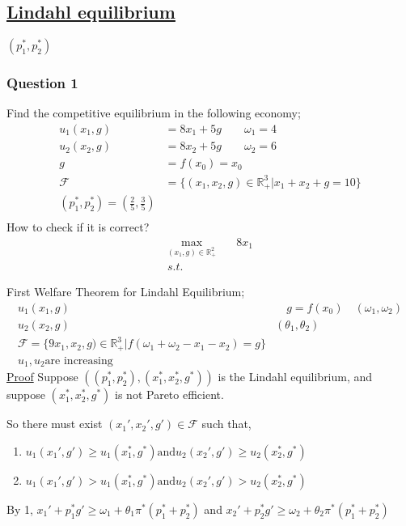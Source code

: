 \documentclass[12pt,a4paper]{article}
\begin{document}
\subsection*{\underline{Lindahl equilibrium}}
\(\left( p_{1}^*,p_{2}^* \right) \)
\subsubsection*{Question 1} 
Find the competitive equilibrium in the following economy;
 \begin{align*}
    u_{1}(x_{1},g)&= 8x_{1} + 5g \qquad \omega_{1}=4 \\
    u_{2}(x_{2},g)&= 8x_{2} + 5g \qquad \omega_{2}=6 \\
    g&=f(x_{0})= x_{0}\\
    \mathcal{F}&= \{(x_{1},x_{2},g) \in \mathbb{R}^3_{+} | x_{1}+x_{2}+g=10\}\\
    \left( p_{1}^*,p_{2}^* \right) = \left( \frac{2}{5},\frac{3}{5} \right) \\
\end{align*}
How to check if it is correct?
 \begin{align*}
       \max_{(x_{1},g)\in \mathbb{R}^{2}_{+}} & \quad 8x_{1} \\
       s.t. &  \quad 
\end{align*}

First Welfare Theorem for Lindahl Equilibrium;
 \begin{align*}
    u_{1}(x_{1},g) & \quad g=f(x_{0}) \quad (\omega_{1},\omega_{2})\\
    u_{2}(x_{2},g) & (\theta_{1},\theta_{2})\\
    \mathcal{F}= \{9x_{1},x_{2},g) \in \mathbb{R}^3_{+} | f(\omega_{1}+ \omega_{2} -x_{1}-x_{2})=g\}\\
    u_{1}, u_{2} \text{are increasing}
\end{align*}
\underline{Proof} Suppose \(\left( (p_{1}^*,p_{2}^*),(x_{1}^*,x_{2}^*,g^*) \right)\)  is the Lindahl equilibrium, and suppose \(\left( x_{1}^*,x_{2}^*,g^* \right)\) is not Pareto efficient.

So there must exist \((x_{1}',x_{2}',g') \in \mathcal{F}\) such that,

\begin{enumerate}
    \item \(u_{1}(x_{1}',g') \geq u_{1}(x_{1}^*,g^*) \text{and} u_{2}(x_{2}',g') \geq u_{2}(x_{2}^*,g^*)\)
    \item \(u_{1}(x_{1}',g') > u_{1}(x_{1}^*,g^*) \text{and} u_{2}(x_{2}',g') > u_{2}(x_{2}^*,g^*)\)
\end{enumerate}
By 1, \(x_{1}'+p_{1}^*g' \geq \omega_{1} + \theta_{1}\pi^*(p_{1}^*+p_{2}^*)\) and \(x_{2}'+ p_{2}^*g' \geq \omega_{2} + \theta_{2}\pi^*(p_{1}^*+p_{2}^*)\) 
\end{document}
